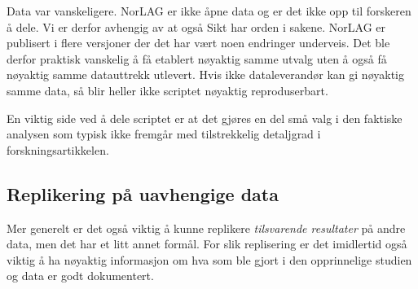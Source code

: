 \documentclass[
  norsk,
  letterpaper,
  DIV=11,
  numbers=noendperiod]{scrreprt}
\theoremstyle{definition}
\theoremstyle{remark}
\begin{document}
Data var vanskeligere. NorLAG er ikke åpne data og er det ikke opp til
forskeren å dele. Vi er derfor avhengig av at også Sikt har orden i
sakene. NorLAG er publisert i flere versjoner der det har vært noen
endringer underveis. Det ble derfor praktisk vanskelig å få etablert
nøyaktig samme utvalg uten å også få nøyaktig samme datauttrekk
utlevert. Hvis ikke dataleverandør kan gi nøyaktig samme data, så blir
heller ikke scriptet nøyaktig reproduserbart.

En viktig side ved å dele scriptet er at det gjøres en del små valg i
den faktiske analysen som typisk ikke fremgår med tilstrekkelig
detaljgrad i forskningsartikkelen.

\subsection{Replikering på uavhengige
data}\label{replikering-puxe5-uavhengige-data}

Mer generelt er det også viktig å kunne replikere \emph{tilsvarende
resultater} på andre data, men det har et litt annet formål. For slik
replisering er det imidlertid også viktig å ha nøyaktig informasjon om
hva som ble gjort i den opprinnelige studien og data er godt
dokumentert.
\end{document}

